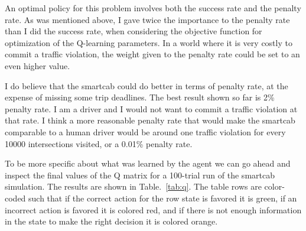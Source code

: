 \documentclass[conference]{IEEEtran}
\begin{document}
An optimal policy for this problem involves both the success rate and the
penalty rate. As was mentioned above, I gave twice the importance to the
penalty rate than I did the success rate, when considering the objective
function for optimization of the Q-learning parameters.  In a world where it is
very costly to commit a traffic violation, the weight given to the penalty
rate could be set to an even higher value. 

I do believe that the smartcab could do better in terms of penalty rate, at the
expense of missing some trip deadlines.  The best result shown so far is 2\%
penalty rate.  I am a driver and I would not want to commit a traffic violation
at that rate.  I think a more reasonable penalty rate that would make the
smartcab comparable to a human driver would be around one traffic violation for
every 10000 intersections visited, or a 0.01\% penalty rate. 

To be more specific about what was learned by the agent we can go ahead and
inspect the final values of the Q matrix for a 100-trial run of the smartcab
simulation.  The results are shown in Table.~\ref{tab:q}.  The table rows are
color-coded  such that if the correct action for the row state is favored it is
green, if an incorrect action is favored it is colored red, and if there is not
enough information in the state to make the right decision it is colored
orange.
\end{document}
